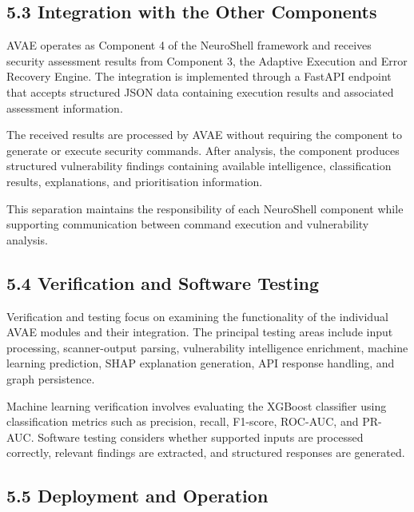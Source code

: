 \documentclass[
]{article}
\begin{document}
\hypertarget{integration-with-the-other-components}{%
\subsection{5.3 Integration with the Other
Components}\label{integration-with-the-other-components}}

AVAE operates as Component 4 of the NeuroShell framework and receives
security assessment results from Component 3, the Adaptive Execution and
Error Recovery Engine. The integration is implemented through a FastAPI
endpoint that accepts structured JSON data containing execution results
and associated assessment information.

The received results are processed by AVAE without requiring the
component to generate or execute security commands. After analysis, the
component produces structured vulnerability findings containing
available intelligence, classification results, explanations, and
prioritisation information.

This separation maintains the responsibility of each NeuroShell
component while supporting communication between command execution and
vulnerability analysis.

\hypertarget{verification-and-software-testing}{%
\subsection{5.4 Verification and Software
Testing}\label{verification-and-software-testing}}

Verification and testing focus on examining the functionality of the
individual AVAE modules and their integration. The principal testing
areas include input processing, scanner-output parsing, vulnerability
intelligence enrichment, machine learning prediction, SHAP explanation
generation, API response handling, and graph persistence.

Machine learning verification involves evaluating the XGBoost classifier
using classification metrics such as precision, recall, F1-score,
ROC-AUC, and PR-AUC. Software testing considers whether supported inputs
are processed correctly, relevant findings are extracted, and structured
responses are generated.

\hypertarget{deployment-and-operation}{%
\subsection{5.5 Deployment and
Operation}\label{deployment-and-operation}}
\end{document}
